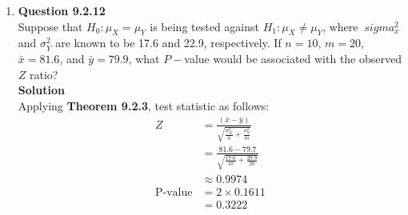 \documentclass{uofa-eng-assignment}
\begin{document}
 \maketitle
\begin{enumerate}
    \item[]
        \textbf{Question 9.2.12} \\
        Suppose that $H_0: \mu_X = \mu_Y$ is being tested against $H_1:\mu_X \neq \mu_Y$,
        where $\    sigma_{x}^{2}$ and $\sigma_{Y}^{2}$ are known to be 17.6 and 22.9, respectively.
        If $n=10$, $m=20$, $\bar{x} = 81.6$, and $\bar{y} = 79.9$,
        what $P-$value would be associated with the observed $Z$ ratio? \\
        \textbf{Solution} \\
        Applying \textbf{Theorem 9.2.3}, test statistic as follows:
        \begin{align*}
            Z              & = \frac{(\bar{x} - \bar{y})}{\sqrt{\frac{\sigma^2_X}{n} + \frac{\sigma^2_Y}{m}}} \\
                           & = \frac{81.6 - 79.7}{\sqrt{\frac{17.6}{10} + \frac{29.9}{20}}}                   \\
                           & \approx 0.9974                                                                   \\
            \text{P-value} & = 2\times 0.1611                                                                 \\
                           & = 0.3222
        \end{align*}

\end{enumerate}
\end{document}
